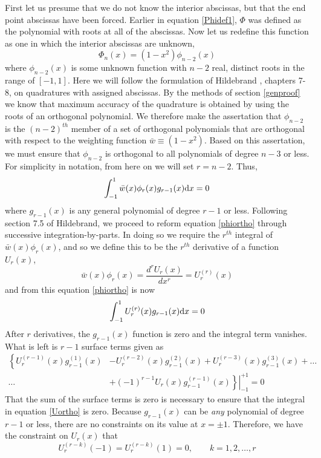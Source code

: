 \documentclass[preprint]{revtex4}
\newcommand{\dx}{{\rm d}x}
\newcommand{\intunit}{\ensuremath{\int_{-1}^{1}}}
\newcommand{\wbar}{\ensuremath{\bar{w}}}
\begin{document}
First let us presume that we do not know the interior abscissas, but that the
end point abscissas have been forced. Earlier in equation \ref{Phidef1}, $\Phi$
was defined as the polynomial with roots at all of the abscissas. Now let us 
redefine this function as one in which the interior abscissas are unknown, 
\begin{equation}
\label{Phiudef}
\Phi_n(x)=(1-x^2)\phi_{n-2}(x)
\end{equation}
where $\phi_{n-2}(x)$ is some unknown function with $n-2$ real, distinct roots
in the range of $[-1,1]$. Here we will follow the formulation of Hildebrand 
\cite{Hildebrand}, chapters 7-8, on quadratures with assigned abscissas. 
By the methods of section \ref{genproof} we know that maximum accuracy of the 
quadrature is obtained by using the roots of an orthogonal polynomial. We 
therefore make the assertation that $\phi_{n-2}$ is the $(n-2)^{th}$ member of
a set of orthogonal polynomials that are orthogonal with respect to the 
weighting function $\wbar \equiv (1-x^2)$. Based on this assertation, we must
ensure that $\phi_{n-2}$ is orthogonal to all polynomials of degree $n-3$ or less. 
For simplicity in notation, from here on we will set $r=n-2$. 
Thus, 
\begin{equation}
\label{phiortho}
\intunit \wbar(x)\phi_r(x)g_{r-1}(x)\dx=0
\end{equation}
where $g_{r-1}(x)$ is any general polynomial of degree $r-1$ or less. 
Following section 7.5 of Hildebrand\cite{Hildebrand}, we proceed to reform
equation \ref{phiortho} through successive integration-by-parts. In doing
so we require the $r^{th}$ integral of $\wbar(x)\phi_r(x)$, and so we define
this to be the $r^{th}$ derivative of a function $U_r(x)$, 
\begin{equation}
\label{Udef}
\wbar(x)\phi_r(x)=\frac{d^rU_r(x)}{dx^r} = U^{(r)}_r(x)
\end{equation}
and from this equation \ref{phiortho} is now
\begin{equation}
\label{Uortho}
\intunit U^{(r)}_r(x)g_{r-1}(x)\dx = 0
\end{equation}
After $r$ derivatives, the $g_{r-1}(x)$ function is zero and the integral term
vanishes. What is left is $r-1$ surface terms given as
\begin{align}
\label{Usurface}
\left\{ U_r^{(r-1)}(x)g_{r-1}^{(1)}(x)\right. &- U_r^{(r-2)}(x)g_{r-1}^{(2)}(x) + U_r^{(r-3)}(x)g_{r-1}^{(3)}(x) + \dots \nonumber \\
 \dots &+ \left. \left. (-1)^{r-1}U_r(x)g_{r-1}^{(r-1)}(x)\right\} \right|_{-1}^{+1}  = 0
\end{align}
That the sum of the surface terms is zero is necessary to ensure that the integral
in equation \ref{Uortho} is  zero. Because $g_{r-1}(x)$ can be {\it any} 
polynomial of degree $r-1$ or less, there are no constraints on its value at 
$x=\pm1$. Therefore, we have the constraint on $U_r(x)$ that 
\begin{equation}
\label{Uend}
U_r^{(r-k)}(-1)=U_r^{(r-k)}(1)=0, \quad\quad k=1,2,\dots,r
\end{equation}
\end{document}
